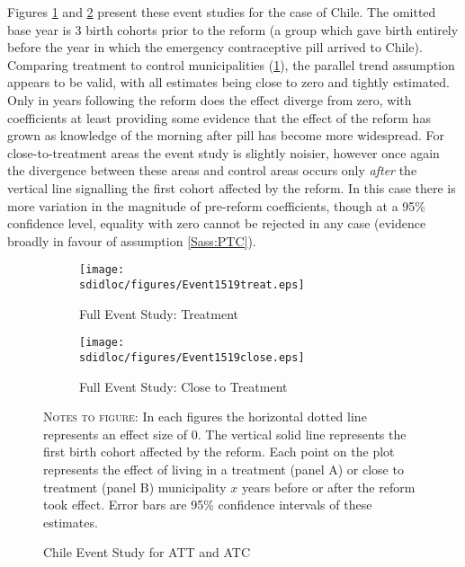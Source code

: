 Figures \ref{Sfig:eventT} and \ref{Sfig:eventC} present these event studies for
the case of Chile.  The omitted base year is 3 birth cohorts prior to the reform
(a group which gave birth entirely before the year in which the emergency 
contraceptive pill arrived to Chile).  Comparing treatment to control 
municipalities (\ref{Sfig:eventT}), the parallel trend assumption appears to
be valid, with all estimates being close to zero and tightly estimated.  Only
in years following the reform does the effect diverge from zero, with 
coefficients at least providing some evidence that the effect of the reform has
grown as knowledge of the morning after pill has become more widespread.  For 
close-to-treatment areas the event study is slightly noisier, however once again 
the divergence between these areas and control areas occurs only \emph{after}
the vertical line signalling the first cohort affected by the reform. In this
case there is more variation in the magnitude of pre-reform coefficients, though
at a 95\% confidence level, equality with zero cannot be rejected in any case 
(evidence broadly in favour of assumption \ref{Sass:PTC}).

\begin{figure}[htpb!]
\begin{center}
\begin{subfigure}{.5\textwidth}
  \centering
  \texttt{[image: \\sdidloc/figures/Event1519treat.eps]}
  \caption{Full Event Study: Treatment}
  \label{Sfig:eventT}
\end{subfigure}%
\begin{subfigure}{.5\textwidth}
  \centering
  \texttt{[image: \\sdidloc/figures/Event1519close.eps]}
  \caption{Full Event Study: Close to Treatment}
  \label{Sfig:eventC}
\end{subfigure}
\caption{Chile Event Study for ATT and ATC}
\label{Sfig:eventStudy}
\end{center}
\begin{footnotesize}
\textsc{Notes to figure}: In each figures the horizontal dotted line represents
an effect size of 0.  The vertical solid line represents the first birth cohort
affected by the reform.  Each point on the plot represents the effect of living 
in a treatment (panel A) or close to treatment (panel B) municipality $x$ years
before or after the reform took effect.  Error bars are 95\% confidence intervals
of these estimates.

\end{footnotesize}
\end{figure}


